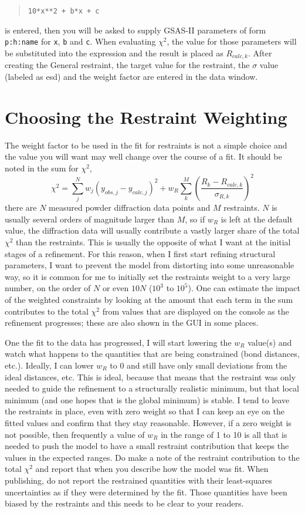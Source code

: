 \begin{quote}
\texttt{10*x**2 + b*x + c}    
\end{quote}
is entered, then you will be asked to supply GSAS-II parameters of form \texttt{p:h:name} for \texttt{x}, \texttt{b} and \texttt{c}. When evaluating $\chi^2$, the value for those parameters will be substituted into the expression and the result is placed as $R_{calc,k}$. After creating the General restraint, the target value for the restraint, the $\sigma$ value (labeled as esd) and the weight factor are entered in the data window. 

\section{Choosing the Restraint Weighting}\label{ref:weightrestraints}
The weight factor to be used in the fit for restraints is not a simple choice and the value you will want may well change over the course of a fit. It should be noted in the sum for $\chi^2$,
$$\chi^2 = \sum_j^N w_j(y_{obs,j}-y_{calc,j})^2 + w_{R} \sum_k^M  \left ( \frac{R_k - R_{calc,k}}{\sigma_{R,k}}\right)^2$$
there are $N$ measured powder diffraction data points and $M$ restraints. $N$ is usually several orders of magnitude larger than $M$, so if $w_R$ is left at the default value, the diffraction data will usually contribute a vastly larger share of the total $\chi^2$ than the restraints. This is usually the opposite of what I want at the initial stages of a refinement. For this reason, when I first start refining structural parameters, I want to prevent the model from distorting into some unreasonable way, so it is common for me to initially set the restraints weight to a very large number, on the order of $N$ or even $10N$ ($10^3$ to  $10^5$). One can estimate the impact of the weighted constraints by looking at the amount that each term in the sum contributes to the total $\chi^2$ from values that are displayed on the console as the refinement progresses; these are also shown in the GUI in some places. 

One the fit to the data has progressed, I will start lowering the $w_R$ value(s) and watch what happens to the quantities that are being constrained (bond distances, etc.). Ideally, I can lower $w_R$ to 0 and still have only small deviations from the ideal distances, etc. This is ideal, because that means that the restraint was only needed to guide the refinement to a structurally realistic minimum, but that local minimum (and one hopes that is the global minimum) is stable. I tend to leave the restraints in place, even with zero weight so that I can keep an eye on the fitted values and confirm that they stay reasonable. However, if a zero weight is not possible, then frequently a value of $w_R$ in the range of 1 to 10 is all that is needed to push the model to have a small restraint contribution that keeps the values in the expected ranges. Do make a note of the restraint contribution to the total $\chi^2$ and report that when you describe how the model was fit. When publishing, do not report the restrained quantities with their least-squares uncertainties as if they were determined by the fit. Those quantities have been biased by the restraints and this needs to be clear to your readers. 

